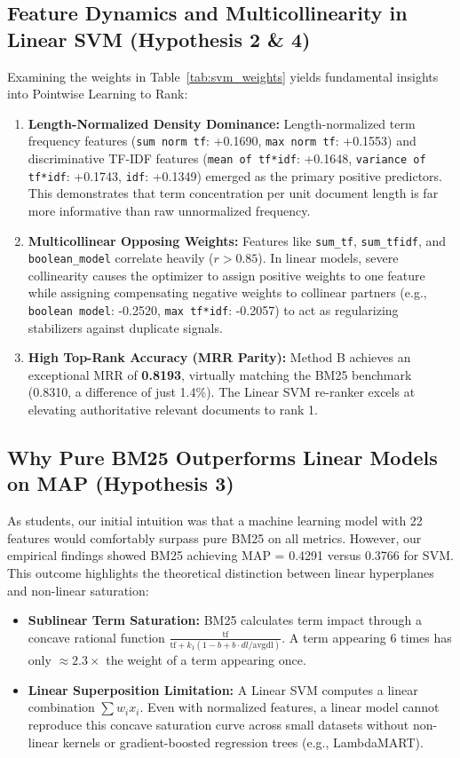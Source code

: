 \documentclass[11pt,a4paper]{article}
\begin{document}
\subsection{Feature Dynamics and Multicollinearity in Linear SVM (Hypothesis 2 \& 4)}
Examining the weights in Table~\ref{tab:svm_weights} yields fundamental insights into Pointwise Learning to Rank:
\begin{enumerate}[leftmargin=*]
    \item \textbf{Length-Normalized Density Dominance:} Length-normalized term frequency features (\texttt{sum norm tf}: +0.1690, \texttt{max norm tf}: +0.1553) and discriminative TF-IDF features (\texttt{mean of tf*idf}: +0.1648, \texttt{variance of tf*idf}: +0.1743, \texttt{idf}: +0.1349) emerged as the primary positive predictors. This demonstrates that term concentration per unit document length is far more informative than raw unnormalized frequency.
    \item \textbf{Multicollinear Opposing Weights:} Features like \texttt{sum\_tf}, \texttt{sum\_tfidf}, and \texttt{boolean\_model} correlate heavily ($r > 0.85$). In linear models, severe collinearity causes the optimizer to assign positive weights to one feature while assigning compensating negative weights to collinear partners (e.g., \texttt{boolean model}: -0.2520, \texttt{max tf*idf}: -0.2057) to act as regularizing stabilizers against duplicate signals.
    \item \textbf{High Top-Rank Accuracy (MRR Parity):} Method B achieves an exceptional MRR of \textbf{0.8193}, virtually matching the BM25 benchmark (0.8310, a difference of just 1.4\%). The Linear SVM re-ranker excels at elevating authoritative relevant documents to rank 1.
\end{enumerate}

\subsection{Why Pure BM25 Outperforms Linear Models on MAP (Hypothesis 3)}
As students, our initial intuition was that a machine learning model with 22 features would comfortably surpass pure BM25 on all metrics. However, our empirical findings showed BM25 achieving MAP = 0.4291 versus 0.3766 for SVM. This outcome highlights the theoretical distinction between linear hyperplanes and non-linear saturation:
\begin{itemize}[leftmargin=*]
    \item \textbf{Sublinear Term Saturation:} BM25 calculates term impact through a concave rational function $\frac{\text{tf}}{\text{tf} + k_1(1-b + b \cdot dl/\text{avgdl})}$. A term appearing 6 times has only $\approx 2.3\times$ the weight of a term appearing once.
    \item \textbf{Linear Superposition Limitation:} A Linear SVM computes a linear combination $\sum w_i x_i$. Even with normalized features, a linear model cannot reproduce this concave saturation curve across small datasets without non-linear kernels or gradient-boosted regression trees (e.g., LambdaMART).
\end{itemize}
\end{document}
